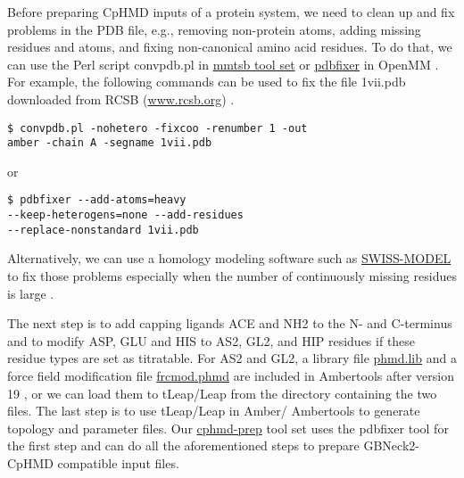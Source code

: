 Before preparing CpHMD inputs of a protein system, 
we need to clean up and fix problems in the PDB file,
e.g., removing non-protein atoms, adding missing residues and atoms, and fixing non-canonical amino acid residues. 
To do that, we can use the Perl script convpdb.pl in \href{http://blue11.bch.msu.edu/mmtsb/Main_Page}{mmtsb tool set} \cite{Feig_Brooks_2004_J.Mol.Graph.Model.} or \href{https://github.com/openmm/pdbfixer}{pdbfixer} in OpenMM \cite{Eastman_Pande_2017_PLoSComput.Biol.}. 
For example, the following commands can be used 
to fix the file 1vii.pdb downloaded from RCSB (\href{www.rcsb.org}{www.rcsb.org}) \cite{Berman_Bourne_2000_NucleicAcidsRes.}.  
\begin{lstlisting}
$ convpdb.pl -nohetero -fixcoo -renumber 1 -out
amber -chain A -segname 1vii.pdb 
\end{lstlisting}
or 
\begin{lstlisting}
$ pdbfixer --add-atoms=heavy 
--keep-heterogens=none --add-residues
--replace-nonstandard 1vii.pdb
\end{lstlisting}
 Alternatively, we can use a homology modeling software such as \href{https://swissmodel.expasy.org/}{SWISS-MODEL} \cite{Waterhouse_Schwede_2018_NucleicAcidsRes.} to fix those problems especially when the number of continuously missing residues is large \cite{Waterhouse_Schwede_2018_NucleicAcidsRes.}.
 
 The next step is to add capping ligands ACE and NH2 to the N- and C-terminus and to modify ASP, GLU and HIS to AS2, GL2, and HIP residues if these residue types are set as titratable. For AS2 and GL2, a library file \href{https://gitlab.com/shenlab-amber-cphmd/cphmd-prep/-/blob/master/Files/phmd.lib}{phmd.lib} and a force field modification file \href{https://gitlab.com/shenlab-amber-cphmd/cphmd-prep/-/blob/master/Files/frcmod.phmd}{frcmod.phmd} are included in Ambertools after version 19 \cite{Case_Kollman_2018}, or we can load them to tLeap/Leap from the directory containing the two files. The last step is to use tLeap/Leap in Amber/ Ambertools to generate topology and parameter files. Our \href{https://gitlab.com/shenlab-amber-cphmd/cphmd-prep}{cphmd-prep} tool set uses the pdbfixer tool for the first step and can do all the aforementioned steps to prepare GBNeck2-CpHMD compatible input files. 


